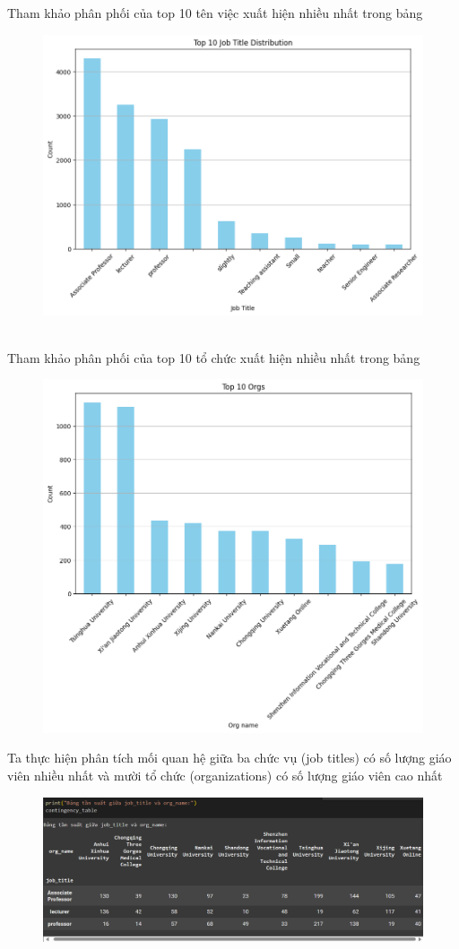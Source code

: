 Tham khảo phân phối của top 10 tên việc xuất hiện nhiều nhất trong bảng
\begin{figure}[h]
    \centering
    \includegraphics[width=0.75\linewidth]{figures/28.png}
\end{figure}\\
Tham khảo phân phối của top 10 tổ chức xuất hiện nhiều nhất trong bảng
\newpage
\begin{figure}
    \centering
    \includegraphics[width=0.75\linewidth]{figures/29.png}
\end{figure}
Ta thực hiện phân tích mối quan hệ giữa ba chức vụ (job titles) có số lượng giáo viên nhiều nhất và mười tổ chức (organizations) có số lượng giáo viên cao nhất
\begin{figure}[h]
    \centering
    \includegraphics[width=0.95\linewidth]{figures/30.png}
\end{figure}
